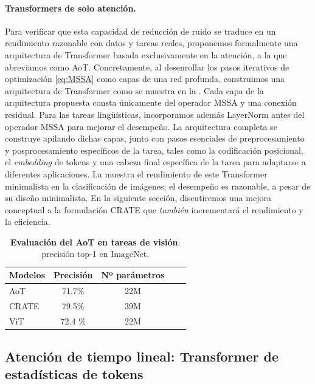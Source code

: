 \documentclass[../../book-main.tex]{subfiles}
\begin{document}
\paragraph{Transformers de solo atención.} Para verificar que esta
capacidad de reducción de ruido se traduce en un rendimiento razonable con datos y tareas reales,
proponemos formalmente una arquitectura de Transformer basada exclusivamente en la atención,
a la que abreviamos como AoT. Concretamente, al desenrollar
los pasos iterativos de optimización \eqref{eq:MSSA} como capas de una red profunda,
construimos una arquitectura de Transformer como se muestra en la
. Cada capa de la arquitectura propuesta
consta únicamente del operador MSSA y una conexión residual. Para las tareas
lingüísticas, incorporamos además LayerNorm antes del operador MSSA
para mejorar el desempeño. La arquitectura completa se construye
apilando dichas capas, junto con pasos esenciales de preprocesamiento
y posprocesamiento específicos de la tarea, tales como la codificación
posicional, el \textit{embedding} de tokens y una cabeza final específica de la tarea para adaptarse a
diferentes aplicaciones. La  muestra el rendimiento de 
este Transformer minimalista en la clasificación
de imágenes; el desempeño es razonable, a pesar de su diseño
minimalista. En la siguiente sección, discutiremos una mejora conceptual a
la formulación CRATE que \textit{también} incrementará el rendimiento y
la eficiencia.

\begin{table}[!t]
    \caption{\textbf{Evaluación del AoT en tareas de visión}: precisión top-1
    en ImageNet.}
    \centering
    \begin{tabular}{lcccc}
        \toprule
        Modelos & Precisión  & Nº parámetros \\
        \midrule
        \midrule
        AoT   & 71.7\% & 22M \\
        CRATE & 79.5\%  & 39M  \\
        ViT & 72.4 \% & 22M \\
        \bottomrule
    \end{tabular}
    \label{tab:aot_vision}
\end{table}

\subsection{Atención de tiempo lineal: Transformer de estadísticas de tokens}\label{sub:tost}
\end{document}

